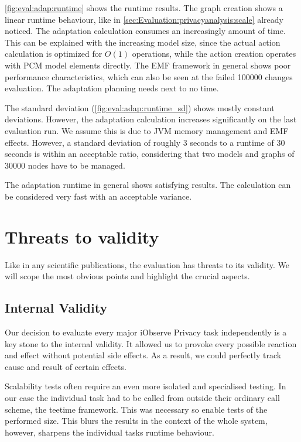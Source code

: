 \autoref{fig:eval:adap:runtime} shows the runtime results. The graph creation shows a linear runtime behaviour, like in \autoref{sec:Evaluation:privacyanalysis:scale} already noticed. The adaptation calculation consumes an increasingly amount of time. This can be explained with the increasing model size, since the actual action calculation is optimized for $O(1)$ operations, while the action creation operates with PCM model elements directly. The EMF framework in general shows poor performance characteristics, which can also be seen at the failed 100000 changes evaluation. The adaptation planning needs next to no time.

The standard deviation (\autoref{fig:eval:adap:runtime_sd}) shows mostly constant deviations. However, the adaptation calculation increases significantly on the last evaluation run. We assume this is due to JVM memory management and EMF effects. However, a standard deviation of roughly 3 seconds to a runtime of 30 seconds is within an acceptable ratio, considering that two models and graphs of 30000 nodes have to be managed.

The adaptation runtime in general shows satisfying results. The calculation can be considered very fast with an acceptable variance.


\section{Threats to validity}
\label{sec:eval:threats}

Like in any scientific publications, the evaluation has threats to its validity. We will scope the most obvious points and highlight the crucial aspects.   

\subsection{Internal Validity} %

Our decision to evaluate every major iObserve Privacy task independently is a key stone to the internal validity. It allowed us to provoke every possible reaction and effect without potential side effects. As a result, we could perfectly track cause and result of certain effects.

Scalability tests often require an even more isolated and specialised testing. In our case the individual task had to be called from outside their ordinary call scheme, the teetime framework. This was necessary so enable tests of the performed size. This blurs the results in the context of the whole system, however, sharpens the individual tasks runtime behaviour.  


